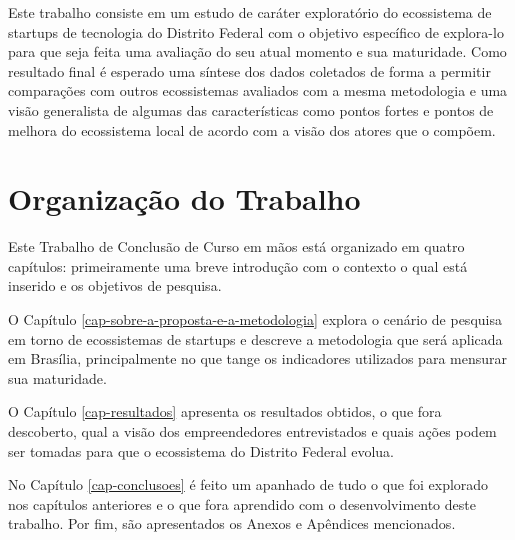 Este trabalho consiste em um estudo de caráter exploratório do ecossistema de startups de tecnologia do Distrito Federal com o objetivo específico de explora-lo para que seja feita uma avaliação do seu atual momento e sua maturidade. Como resultado final é esperado uma síntese dos dados coletados de forma a permitir comparações com outros ecossistemas avaliados com a mesma metodologia e uma visão generalista de algumas das características como pontos fortes e pontos de melhora do ecossistema local de acordo com a visão dos atores que o compõem. 

\section{Organização do Trabalho}
\label{section:organizacao_do_trabalho}

Este Trabalho de Conclusão de Curso em mãos está organizado em quatro capítulos: primeiramente uma breve introdução com o contexto o qual está inserido e os objetivos de pesquisa.

O Capítulo \ref{cap-sobre-a-proposta-e-a-metodologia} explora o cenário de pesquisa em torno de ecossistemas de startups e descreve a metodologia que será aplicada em Brasília, principalmente no que tange os indicadores utilizados para mensurar sua maturidade.

O Capítulo \ref{cap-resultados} apresenta os resultados obtidos, o que fora descoberto, qual a visão dos empreendedores entrevistados e quais ações podem ser tomadas para que o ecossistema do Distrito Federal evolua.

No Capítulo \ref{cap-conclusoes} é feito um apanhado de tudo o que foi explorado nos capítulos anteriores e o que fora aprendido com o desenvolvimento deste trabalho. Por fim, são apresentados os Anexos e Apêndices mencionados.
